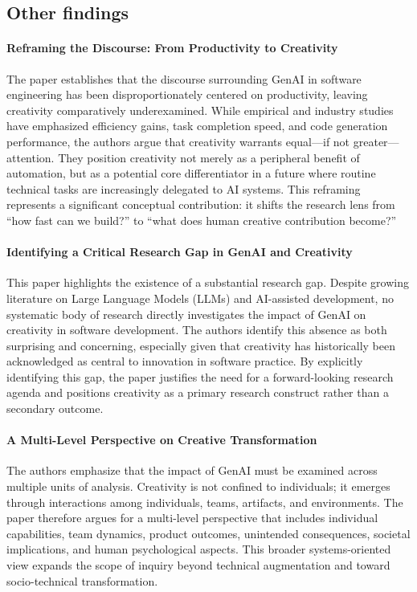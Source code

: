 \subsection{Other findings}
\paragraph{Reframing the Discourse: From Productivity to Creativity}
The paper establishes that the discourse surrounding GenAI in software engineering has been disproportionately centered on productivity, leaving creativity comparatively underexamined. While empirical and industry studies have emphasized efficiency gains, task completion speed, and code generation performance, the authors argue that creativity warrants equal—if not greater—attention. They position creativity not merely as a peripheral benefit of automation, but as a potential core differentiator in a future where routine technical tasks are increasingly delegated to AI systems. This reframing represents a significant conceptual contribution: it shifts the research lens from “how fast can we build?” to “what does human creative contribution become?”

\paragraph{Identifying a Critical Research Gap in GenAI and Creativity}
This paper highlights the existence of a substantial research gap. Despite growing literature on Large Language Models (LLMs) and AI-assisted development, no systematic body of research directly investigates the impact of GenAI on creativity in software development. The authors identify this absence as both surprising and concerning, especially given that creativity has historically been acknowledged as central to innovation in software practice. By explicitly identifying this gap, the paper justifies the need for a forward-looking research agenda and positions creativity as a primary research construct rather than a secondary outcome.

\paragraph{A Multi-Level Perspective on Creative Transformation}
The authors emphasize that the impact of GenAI must be examined across multiple units of analysis. Creativity is not confined to individuals; it emerges through interactions among individuals, teams, artifacts, and environments. The paper therefore argues for a multi-level perspective that includes individual capabilities, team dynamics, product outcomes, unintended consequences, societal implications, and human psychological aspects. This broader systems-oriented view expands the scope of inquiry beyond technical augmentation and toward socio-technical transformation.

